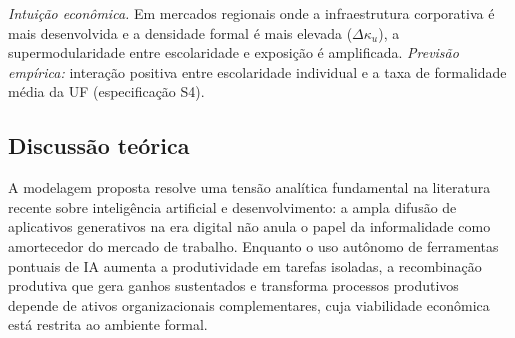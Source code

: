 \textit{Intuição econômica.} Em mercados regionais onde a infraestrutura corporativa é mais desenvolvida e a densidade formal é mais elevada ($\Delta\kappa_u$), a supermodularidade entre escolaridade e exposição é amplificada. \emph{Previsão empírica:} interação positiva entre escolaridade individual e a taxa de formalidade média da UF (especificação S4).

\subsection{Discussão teórica}

A modelagem proposta resolve uma tensão analítica fundamental na literatura recente sobre inteligência artificial e desenvolvimento: a ampla difusão de aplicativos generativos na era digital não anula o papel da informalidade como amortecedor do mercado de trabalho. Enquanto o uso autônomo de ferramentas pontuais de IA aumenta a produtividade em tarefas isoladas, a recombinação produtiva que gera ganhos sustentados e transforma processos produtivos depende de ativos organizacionais complementares, cuja viabilidade econômica está restrita ao ambiente formal.

